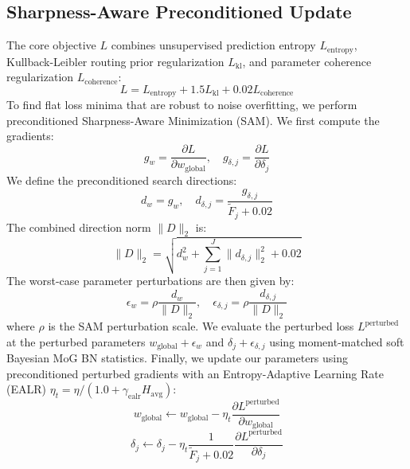 \documentclass{article}
\theoremstyle{plain}
\theoremstyle{definition}
\theoremstyle{remark}
\begin{document}
\subsection{Sharpness-Aware Preconditioned Update}
The core objective $L$ combines unsupervised prediction entropy $L_{\text{entropy}}$, Kullback-Leibler routing prior regularization $L_{\text{kl}}$, and parameter coherence regularization $L_{\text{coherence}}$:
\begin{equation}
L = L_{\text{entropy}} + 1.5 L_{\text{kl}} + 0.02 L_{\text{coherence}}
\end{equation}
To find flat loss minima that are robust to noise overfitting, we perform preconditioned Sharpness-Aware Minimization (SAM). We first compute the gradients:
\begin{equation}
g_w = \frac{\partial L}{\partial w_{\text{global}}}, \quad g_{\delta,j} = \frac{\partial L}{\partial \delta_j}
\end{equation}
We define the preconditioned search directions:
\begin{equation}
d_w = g_w, \quad d_{\delta,j} = \frac{g_{\delta,j}}{\tilde{F}_j + 0.02}
\end{equation}
The combined direction norm $\|D\|_2$ is:
\begin{equation}
\|D\|_2 = \sqrt{d_w^2 + \sum_{j=1}^J \|d_{\delta,j}\|_2^2 + 0.02}
\end{equation}
The worst-case parameter perturbations are then given by:
\begin{equation}
\epsilon_w = \rho \frac{d_w}{\|D\|_2}, \quad \epsilon_{\delta,j} = \rho \frac{d_{\delta,j}}{\|D\|_2}
\end{equation}
where $\rho$ is the SAM perturbation scale. We evaluate the perturbed loss $L^{\text{perturbed}}$ at the perturbed parameters $w_{\text{global}} + \epsilon_w$ and $\delta_j + \epsilon_{\delta,j}$ using moment-matched soft Bayesian MoG BN statistics. Finally, we update our parameters using preconditioned perturbed gradients with an Entropy-Adaptive Learning Rate (EALR) $\eta_t = \eta / (1.0 + \gamma_{\text{ealr}} H_{\text{avg}})$:
\begin{equation}
w_{\text{global}} \leftarrow w_{\text{global}} - \eta_t \frac{\partial L^{\text{perturbed}}}{\partial w_{\text{global}}}
\end{equation}
\begin{equation}
\delta_j \leftarrow \delta_j - \eta_t \frac{1}{\tilde{F}_j + 0.02} \frac{\partial L^{\text{perturbed}}}{\partial \delta_j}
\end{equation}
\end{document}

